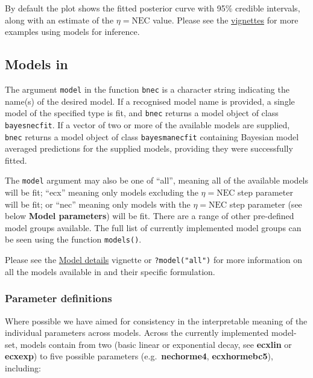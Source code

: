 \documentclass[
]{jss}
\begin{document}
By default the plot shows the fitted posterior curve with 95\% credible
intervals, along with an estimate of the \(\eta = \text{NEC}\) value.
Please see the
\href{https://open-aims.github.io/bayesnec/articles/}{vignettes} for
more examples using  models for inference.

\subsection[Models in bayesnec]{Models in
}\label{models-in}

The argument \texttt{model} in the function \texttt{bnec} is a character
string indicating the name(s) of the desired model. If a recognised
model name is provided, a single model of the specified type is fit, and
\texttt{bnec} returns a model object of class \texttt{bayesnecfit}. If a
vector of two or more of the available models are supplied,
\texttt{bnec} returns a model object of class \texttt{bayesmanecfit}
containing Bayesian model averaged predictions for the supplied models,
providing they were successfully fitted.

The \texttt{model} argument may also be one of ``all'', meaning all of
the available models will be fit; ``ecx'' meaning only models excluding
the \(\eta = \text{NEC}\) step parameter will be fit; or ``nec'' meaning
only models with the \(\eta = \text{NEC}\) step parameter (see below
\textbf{Model parameters}) will be fit. There are a range of other
pre-defined model groups available. The full list of currently
implemented model groups can be seen using the function
\texttt{models()}.

Please see the
\href{https://open-aims.github.io/bayesnec/articles/example2b.html}{Model
details} vignette or \texttt{?model("all")} for more information on all
the models available in  and their specific formulation.

\hypertarget{parameter-definitions}{%
\subsubsection{Parameter definitions}\label{parameter-definitions}}

Where possible we have aimed for consistency in the interpretable
meaning of the individual parameters across models. Across the currently
implemented model-set, models contain from two (basic linear or
exponential decay, see \textbf{ecxlin} or \textbf{ecxexp}) to five
possible parameters (e.g.~\textbf{nechorme4}, \textbf{ecxhormebc5}),
including:
\end{document}
